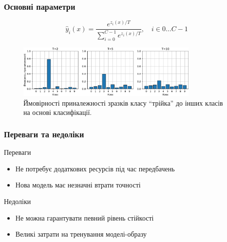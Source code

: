 \documentclass{beamer}
\numberwithin{equation}{section}
\begin{document}
	\begin{frame}
		\frametitle{Основні параметри}
		
		\begin{equation}
			\label{softmax-t}
			\hat{y}_i(x)=\frac{e^{z_{i}(x) / T}}{\sum\limits_{i=0}^{C-1} e^{z_{i}(x) / T}}, \quad i \in 0 \dots C-1
		\end{equation}
		
		\begin{figure}[h]
			\centering
			\includegraphics[width=0.8\textwidth]{../images/TvsP.pdf}
			
			\caption{Ймовірності приналежності зразків класу ``трійка'' до інших класів на основі класифікації.}
		\end{figure}
	\end{frame}


	\begin{frame}
		\frametitle{Переваги та недоліки}
		\begin{block}{Переваги}
			\begin{itemize}
				\item Не потребує додаткових ресурсів під час передбачень
				\item Нова модель має незначні втрати точності
			\end{itemize}
		\end{block}
	
		\begin{block}{Недоліки}
			\begin{itemize}
				\item Не можна гарантувати певний рівень стійкості
				\item Великі затрати на тренування моделі-образу
			\end{itemize}
		\end{block}
	\end{frame}
	
\end{document}

